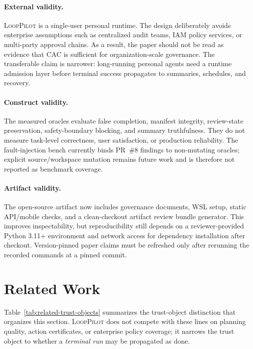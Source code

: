 \documentclass[11pt]{article}
\newcommand{\looppilot}{\textsc{LoopPilot}}
\newcommand{\cac}{\textsc{CAC}}
\begin{document}
\paragraph{External validity.}
\looppilot{} is a single-user personal runtime.
The design deliberately avoids enterprise assumptions such as centralized audit teams, IAM policy services, or multi-party approval chains.
As a result, the paper should not be read as evidence that \cac{} is sufficient for organization-scale governance.
The transferable claim is narrower: long-running personal agents need a runtime admission layer before terminal success propagates to summaries, schedules, and recovery.

\paragraph{Construct validity.}
The measured oracles evaluate false completion, manifest integrity, review-state preservation, safety-boundary blocking, and summary truthfulness.
They do not measure task-level correctness, user satisfaction, or production reliability.
The fault-injection bench currently binds PR~\#8 findings to non-mutating oracles; explicit source/workspace mutation remains future work and is therefore not reported as benchmark coverage.

\paragraph{Artifact validity.}
The open-source artifact now includes governance documents, WSL setup, static API/mobile checks, and a clean-checkout artifact review bundle generator.
This improves inspectability, but reproducibility still depends on a reviewer-provided Python 3.11+ environment and network access for dependency installation after checkout.
Version-pinned paper claims must be refreshed only after rerunning the recorded commands at a pinned commit.

\section{Related Work}
\label{sec:related}

Table~\ref{tab:related-trust-objects} summarizes the trust-object distinction that organizes this section.
\looppilot{} does not compete with these lines on planning quality, action certificates, or enterprise policy coverage; it narrows the trust object to whether a \emph{terminal run} may be propagated as done.
\end{document}
